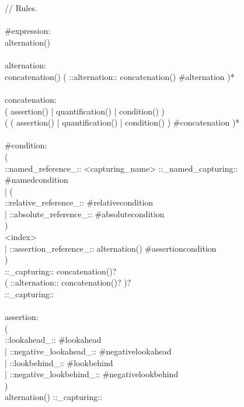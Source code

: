 \begin{bigbigpre}
 \\
 \\
// Rules. \\
 \\
#expression: \\
    alternation() \\
 \\
alternation: \\
    concatenation() ( ::alternation:: concatenation() #alternation )* \\
 \\
concatenation: \\
    (   assertion() | quantification() | condition() ) \\
    ( ( assertion() | quantification() | condition() ) #concatenation )* \\
 \\
#condition: \\
    ( \\
        ::named_reference_:: <capturing_name> ::_named_capturing:: #namedcondition \\
      | ( \\
            ::relative_reference_:: #relativecondition \\
          | ::absolute_reference_:: #absolutecondition \\
        ) \\
        <index> \\
      | ::assertion_reference_:: alternation() #assertioncondition \\
    ) \\
    ::_capturing:: concatenation()? \\
    ( ::alternation:: concatenation()? )? \\
    ::_capturing:: \\
 \\
assertion: \\
    ( \\
        ::lookahead_::           #lookahead \\
      | ::negative_lookahead_::  #negativelookahead \\
      | ::lookbehind_::          #lookbehind \\
      | ::negative_lookbehind_:: #negativelookbehind \\
    ) \\
    alternation() ::_capturing:: \\
 \\

\end{bigbigpre}
